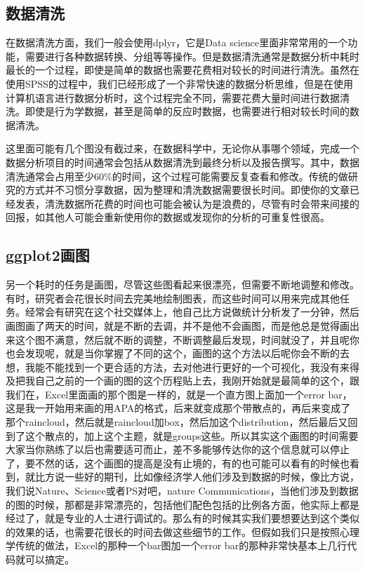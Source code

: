 \documentclass[
  oneside]{book}
\begin{document}
\hypertarget{ux6570ux636eux6e05ux6d17}{%
\subsection{数据清洗}\label{ux6570ux636eux6e05ux6d17}}

在数据清洗方面，我们一般会使用dplyr，它是Data
science里面非常常用的一个功能，需要进行各种数据转换、分组等等操作。但是数据清洗通常是数据分析中耗时最长的一个过程，即使是简单的数据也需要花费相对较长的时间进行清洗。虽然在使用SPSS的过程中，我们已经形成了一个非常快速的数据分析思维，但是在使用计算机语言进行数据分析时，这个过程完全不同，需要花费大量时间进行数据清洗。即使是行为学数据，甚至是简单的反应时数据，也需要进行相对较长时间的数据清洗。

这里面可能有几个图没有截过来，在数据科学中，无论你从事哪个领域，完成一个数据分析项目的时间通常会包括从数据清洗到最终分析以及报告撰写。其中，数据清洗通常会占用至少60\%的时间，这个过程可能需要反复查看和修改。传统的做研究的方式并不习惯分享数据，因为整理和清洗数据需要很长时间。即使你的文章已经发表，清洗数据所花费的时间也可能会被认为是浪费的，尽管有时会带来间接的回报，如其他人可能会重新使用你的数据或发现你的分析的可重复性很高。

\hypertarget{ggplot2ux753bux56fe}{%
\subsection{ggplot2画图}\label{ggplot2ux753bux56fe}}

另一个耗时的任务是画图，尽管这些图看起来很漂亮，但需要不断地调整和修改。有时，研究者会花很长时间去完美地绘制图表，而这些时间可以用来完成其他任务。经常会有研究在这个社交媒体上，他自己比方说做统计分析发了一分钟，然后画图画了两天的时间，就是不断的去调，并不是他不会画图，而是他总是觉得画出来这个图不满意，然后就不断的调整，不断调整最后发现，时间就没了，并且呢你也会发现呢，就是当你掌握了不同的这个，画图的这个方法以后呢你会不断的去想，我能不能找到一个更合适的方法，去对他进行更好的一个可视化，我没有来得及把我自己之前的一个画的图的这个历程贴上去，我刚开始就是最简单的这个，跟我们在，Excel里面画的那个图是一样的，就是一个直方图上面加一个error
bar，这是我一开始用来画的用APA的格式，后来就变成那个带散点的，再后来变成了那个raincloud，然后就是raincloud加box，然后加这个distribution，然后最后又回到了这个散点的，加上这个主题，就是groups这些。所以其实这个画图的时间需要大家当你熟练了以后也需要适可而止，差不多能够传达你的这个信息就可以停止了，要不然的话，这个画图的提高是没有止境的，有的也可能可以看有的时候也看到，就比方说一些好的期刊，比如像经济学人他们涉及到数据的时候，像比方说，我们说Nature、Science或者PS对吧，nature
Communications，当他们涉及到数据的图的时候，那都是非常漂亮的，包括他们配色包括的比例各方面，他实际上都是经过了，就是专业的人士进行调试的。那么有的时候其实我们要想要达到这个类似的效果的话，也需要花很长的时间去做这些细节的工作。但假如我们只是按照心理学传统的做法，Excel的那种一个bar图加一个error
bar的那种非常快基本上几行代码就可以搞定。
\end{document}
